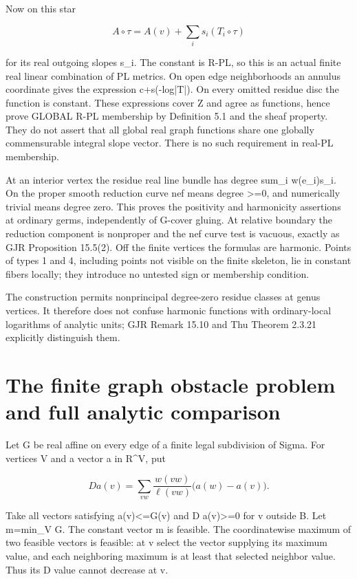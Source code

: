 \documentclass[11pt]{article}
\begin{document}
Now on this star

\[
A\circ\tau=A(v)+\sum_i s_i(T_i\circ\tau)
\]

for its real outgoing slopes s\_i. The constant is R-PL, so this is an actual finite real linear combination of PL metrics. On open edge neighborhoods an annulus coordinate gives the expression c+s(-log|T|). On every omitted residue disc the function is constant. These expressions cover Z and agree as functions, hence prove GLOBAL R-PL membership by Definition 5.1 and the sheaf property. They do not assert that all global real graph functions share one globally commensurable integral slope vector. There is no such requirement in real-PL membership.

At an interior vertex the residue real line bundle has degree sum\_i w(e\_i)s\_i. On the proper smooth reduction curve nef means degree >=0, and numerically trivial means degree zero. This proves the positivity and harmonicity assertions at ordinary germs, independently of G-cover gluing. At relative boundary the reduction component is nonproper and the nef curve test is vacuous, exactly as GJR Proposition 15.5(2). Off the finite vertices the formulas are harmonic. Points of types 1 and 4, including points not visible on the finite skeleton, lie in constant fibers locally; they introduce no untested sign or membership condition.

The construction permits nonprincipal degree-zero residue classes at genus vertices. It therefore does not confuse harmonic functions with ordinary-local logarithms of analytic units; GJR Remark 15.10 and Thu Theorem 2.3.21 explicitly distinguish them.

\section{The finite graph obstacle problem and full analytic comparison}

Let G be real affine on every edge of a finite legal subdivision of Sigma. For vertices V and a vector a in R\textasciicircum{}V, put

\[
D a(v)=\sum_{vw}\frac{w(vw)}{\ell(vw)}\bigl(a(w)-a(v)\bigr).
\]

Take all vectors satisfying a(v)<=G(v) and D a(v)>=0 for v outside B. Let m=min\_V G. The constant vector m is feasible. The coordinatewise maximum of two feasible vectors is feasible: at v select the vector supplying its maximum value, and each neighboring maximum is at least that selected neighbor value. Thus its D value cannot decrease at v.
\end{document}
